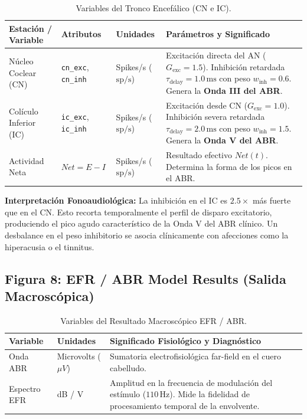 \documentclass[12pt,a4paper]{article}
\begin{document}
\begin{table}[H]
\centering
\caption{Variables del Tronco Encefálico (CN e IC).}
\begin{tabularx}{\textwidth}{>{\raggedright\arraybackslash}p{3.0cm} >{\raggedright\arraybackslash}p{3.4cm} >{\raggedright\arraybackslash}p{2.8cm} X}
\toprule
\textbf{Estación / Variable} & \textbf{Atributos} & \textbf{Unidades} & \textbf{Parámetros y Significado} \\
\midrule
Núcleo Coclear (CN) & \texttt{cn\_exc}, \texttt{cn\_inh} & Spikes/s ($\text{sp/s}$) & Excitación directa del AN ($G_{\text{exc}} = 1.5$). Inhibición retardada $\tau_{\text{delay}} = 1.0\,\text{ms}$ con peso $w_{\text{inh}} = 0.6$. Genera la \textbf{Onda III del ABR}. \\
Colículo Inferior (IC) & \texttt{ic\_exc}, \texttt{ic\_inh} & Spikes/s ($\text{sp/s}$) & Excitación desde CN ($G_{\text{exc}} = 1.0$). Inhibición severa retardada $\tau_{\text{delay}} = 2.0\,\text{ms}$ con peso $w_{\text{inh}} = 1.5$. Genera la \textbf{Onda V del ABR}. \\
Actividad Neta & $Net = E - I$ & Spikes/s ($\text{sp/s}$) & Resultado efectivo $Net(t)$. Determina la forma de los picos en el ABR. \\
\bottomrule
\end{tabularx}
\end{table}

\textbf{Interpretación Fonoaudiológica:} La inhibición en el IC es $2.5\times$ más fuerte que en el CN. Esto recorta temporalmente el perfil de disparo excitatorio, produciendo el pico agudo característico de la Onda V del ABR clínico. Un desbalance en el peso inhibitorio se asocia clínicamente con afecciones como la hiperacusia o el tinnitus.

\subsection{Figura 8: EFR / ABR Model Results (Salida Macroscópica)}

\begin{table}[H]
\centering
\caption{Variables del Resultado Macroscópico EFR / ABR.}
\begin{tabularx}{\textwidth}{>{\raggedright\arraybackslash}p{3.5cm} >{\raggedright\arraybackslash}p{3.0cm} X}
\toprule
\textbf{Variable} & \textbf{Unidades} & \textbf{Significado Fisiológico y Diagnóstico} \\
\midrule
Onda ABR & Microvolts ($\mu V$) & Sumatoria electrofisiológica far-field en el cuero cabelludo. \\
Espectro EFR & dB / V & Amplitud en la frecuencia de modulación del estímulo ($110\,\text{Hz}$). Mide la fidelidad de procesamiento temporal de la envolvente. \\
\bottomrule
\end{tabularx}
\end{table}
\end{document}
